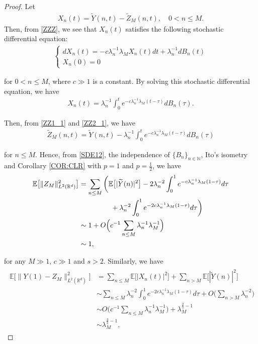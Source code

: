 \documentclass[%
11pt,  reqno]{amsart}
\theoremstyle{remarkstyle}
\newcommand{\1}{\hspace{0.2mm}\text{I}\hspace{0.2mm}}
\newcommand{\noi}{\noindent}
\newcommand{\R}{\mathbb{R}}
\newcommand{\E}{\mathbb{E}}
\newcommand{\ld}{\lambda}
\newcommand{\wt}{\widetilde}
\newcommand{\N}{\mathbb{N}}
\numberwithin{equation}{section}
\numberwithin{theorem}{section}
\begin{document}
	\begin{proof}
		Let 
		\begin{align}
			X_n(t)=\wt Y (n, t)- \wt Z_{M}(n, t), 
			\quad 0 < n \le M.
			\label{ZZ1_1} 
		\end{align}
		Then,  from  \eqref{ZZZ}, 
		we see that $X_n(t)$ satisfies 
		the following stochastic differential equation:
		\begin{align*}
			\begin{cases}
				dX_n(t)=- c \ld_n^{-1} \ld_M  X_n(t) dt + \ld_n^{-1} dB_n(t)\\
				X_n(0)=0
			\end{cases}
		\end{align*}	
		
		\noi
		for $0 < n \le M$, where $c \gg 1$ is a constant.
		By solving this stochastic differential equation, we have
		\begin{align}
			X_n(t)= \ld_n^{-1} \int_0^t e^{- c  \ld_n^{-1} \ld_M  (t-\tau)}dB_n(\tau).
			\label{ZZ2_1}
		\end{align}
		
		\noi
		Then, from \eqref{ZZ1_1} and \eqref{ZZ2_1}, we have 
		\begin{align}
			\wt Z_{M}(n, t)= \wt Y (n, t)- \ld_n^{-1} \int_0^t  e^{-   c \ld_n^{-1} \ld_M  (t-\tau)} dB_n(\tau)
			\label{SDE12}
		\end{align}
		
		\noi
		for $n \le M$. Hence, from \eqref{SDE12}, the independence of $\{B_n \}_{n \in \N}$, 
		Ito's isometry and Corollary \ref{COR:CLR} with $p = 1$ and $p = \frac12$, we have
		\begin{align}
			\begin{split}
				\E \big[ \|Z_M\|_{L^2 ({\R^d})}^2 \big]&=\sum_{n \le M} \bigg( \E \big[  | \wt Y (n) |^2  \big]
				- 2 \ld_n^{- 2} \int_0^1 e^{-  c \ld_n^{-1} \ld_M    (1-\tau)}d\tau \\
				& \hphantom{XXXXX}
				+ \ld_n^{- 2} \int_0^1 e^{-2 c \ld_n^{-1} \ld_M   (1-\tau)}d\tau \bigg)\\
				& \sim 1 + O\Big( c^{-1}\sum_{n \le M } \ld_n^{-1} \ld_M^{-1}  \Big)\\
				& \sim 1,
			\end{split}
			\label{ODE3}
		\end{align}
		
		\noi
		for any $M\gg 1$, $c \gg 1$ and $s >2$. 
		Similarly,  
		we have 
		\begin{align}
			\begin{split}
				\E \big[ \|Y(1) - Z_M\|_{L^2 ({\R^d})}^2 \big] & = \sum_{n \le M}  \E \big[  | X_n (t) |^2  \big] + \sum_{n > M}  \E \big[  | \wt Y (n) |^2  \big] \\
				& \sim  \sum_{n \le M}  \ld_n^{- 2} \int_0^1 e^{-2 c \ld_n^{-1} \ld_M   (1-\tau)}d\tau  + O\Big(  \sum_{n > M } \ld_n^{-2}    \Big)\\
				& \sim O\Big( c^{-1}\sum_{n \le M } \ld_n^{-1} \ld_M^{-1}  \Big) + \ld_M^{\frac2s - 1} \\
				& \sim \ld_M^{\frac2s - 1} ,
			\end{split}
			\label{ODE31}
		\end{align}
		

\end{proof}
\end{document}
